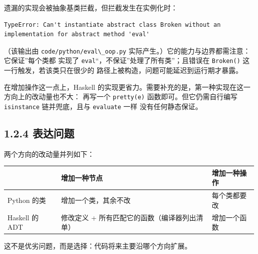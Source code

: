 遗漏的实现会被抽象基类拦截，但拦截发生在实例化时：

\begin{lstlisting}
TypeError: Can't instantiate abstract class Broken without an implementation for abstract method 'eval'
\end{lstlisting}

（该输出由 \passthrough{\lstinline!code/python/eval\_oop.py!} 实际产生。）它的能力与边界都需注意：它保证''每个类都
实现了 \passthrough{\lstinline!eval!}``，不保证''处理了所有类''；且错误在 \passthrough{\lstinline!Broken()!} 这一行触发，若该类只在很少的
路径上被构造，问题可能延迟到运行期才暴露。

在增加操作这一点上，Haskell 的实现更省力。需要补充的是，第一种实现在这一方向上的改动量也不大：
再写一个 \passthrough{\lstinline!pretty(e)!} 函数即可。但它仍需自行编写 \passthrough{\lstinline!isinstance!} 链并兜底，且与 \passthrough{\lstinline!evaluate!} 一样
没有任何静态保证。

\subsection{1.2.4 表达问题}\label{ux8868ux8fbeux95eeux9898}

两个方向的改动量并列如下：

{\def\LTcaptype{none} %
\begin{longtable}[]{@{}
  >{\raggedright\arraybackslash}p{}
  >{\raggedright\arraybackslash}p{}
  >{\raggedright\arraybackslash}p{}@{}}
\toprule\noalign{}
\begin{minipage}[b]{\linewidth}\raggedright
\end{minipage} & \begin{minipage}[b]{\linewidth}\raggedright
增加一种节点
\end{minipage} & \begin{minipage}[b]{\linewidth}\raggedright
增加一种操作
\end{minipage} \\
\midrule\noalign{}
\endhead
\bottomrule\noalign{}
\endlastfoot
Python 的类 & 增加一个类，其余不改 & 每个类都要改 \\
Haskell 的 ADT & 修改定义 + 所有匹配它的函数（编译器列出清单） & 增加一个函数 \\
\end{longtable}
}

这不是优劣问题，而是选择：代码将来主要沿哪个方向扩展。

